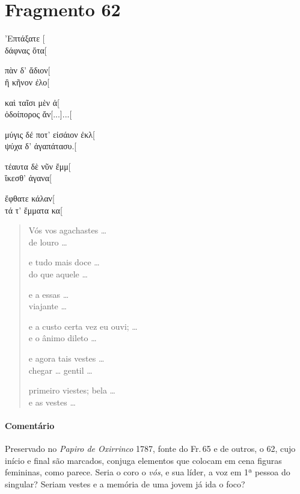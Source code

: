 \section{Fragmento 62}

\begin{gkverse}
’Επτάξατε [\\
δάφνας ὄτα[

πὰν δ’ ἄδιον[\\
ἢ κῆνον ἐλο[

καὶ ταῖσι μὲν ἀ[\\
ὀδοίπορος ἄν[...]...[

μύγις δέ ποτ’ εἰσάιον ἐκλ[\\
ψύχα δ’ ἀγαπάτασυ.[

τέαυτα δὲ νῦν ἔμμ[\\
ἴκεσθ’ ἀγανα[

ἔφθατε κάλαν[\\
τά τ’ ἔμματα κα[
\end{gkverse}

\begin{verse}
Vós vos agachastes \ldots{}\\
de louro \ldots{}\\

\medskip

e tudo mais doce \ldots{}\\
do que aquele \ldots{}\\

\medskip

e a essas \ldots{}\\
viajante \ldots{}\\

\medskip

e a custo certa vez eu ouvi; \ldots{}\\
e o ânimo dileto \ldots{}\\

\medskip

e agora tais vestes \ldots{}\\ 
chegar \ldots{} gentil \ldots{}\\

\medskip

primeiro viestes; bela \ldots{}\\ 
e as vestes \ldots{}
\end{verse}

\medskip

{\paragraph{Comentário} Preservado no \emph{Papiro de Oxirrinco} 1787, fonte do Fr.\,65 e de outros, o 62, cujo início e final são marcados, conjuga elementos que colocam em cena figuras femininas, como parece. Seria o coro o \emph{vós}, e sua líder, a voz em 1ª pessoa do singular? Seriam vestes e a memória de uma jovem já ida o foco?}

